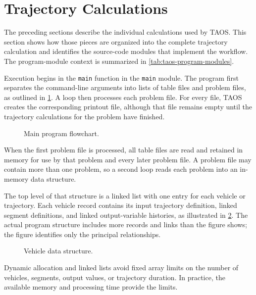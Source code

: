 \section{Trajectory Calculations}\label{sec:trajectory-calculations}

The preceding sections describe the individual calculations used by TAOS. This
section shows how those pieces are organized into the complete trajectory
calculation and identifies the source-code modules that implement the workflow.
The program-module context is summarized in \cref{tab:taos-program-modules}.


Execution begins in the \texttt{main} function in the \texttt{main} module. The
program first separates the command-line arguments into lists of table files and
problem files, as outlined in \cref{fig:main-program-flow}. A loop then processes
each problem file. For every file, TAOS creates the corresponding printout file,
although that file remains empty until the trajectory calculations for the problem
have finished.

\begin{figure}[htbp]
  \centering
  
  \caption{Main program flowchart.}
  \label{fig:main-program-flow}
\end{figure}

When the first problem file is processed, all table files are read and retained in
memory for use by that problem and every later problem file. A problem file may
contain more than one problem, so a second loop reads each problem into an
in-memory data structure.

The top level of that structure is a linked list with one entry for each vehicle or
trajectory. Each vehicle record contains its input trajectory definition, linked
segment definitions, and linked output-variable histories, as illustrated in
\cref{fig:vehicle-data-structure}. The actual program structure includes more
records and links than the figure shows; the figure identifies only the principal
relationships.

\begin{figure}[htbp]
  \centering
  
  \caption{Vehicle data structure.}
  \label{fig:vehicle-data-structure}
\end{figure}

Dynamic allocation and linked lists avoid fixed array limits on the number of
vehicles, segments, output values, or trajectory duration. In practice, the available
memory and processing time provide the limits.

